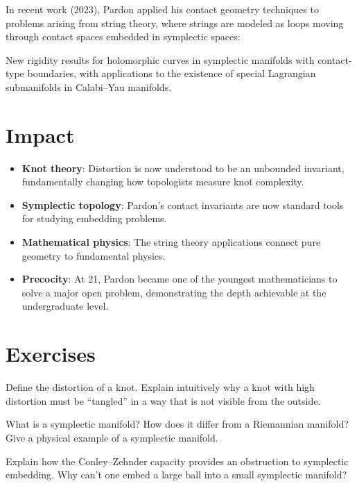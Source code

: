 In recent work (2023), Pardon applied his contact geometry techniques to problems arising from string theory, where strings are modeled as loops moving through contact spaces embedded in symplectic spaces:

\begin{theorem}
New rigidity results for holomorphic curves in symplectic manifolds with contact-type boundaries, with applications to the existence of special Lagrangian submanifolds in Calabi--Yau manifolds.
\end{theorem}

\section{Impact}
\begin{itemize}
\item \textbf{Knot theory}: Distortion is now understood to be an unbounded invariant, fundamentally changing how topologists measure knot complexity.
\item \textbf{Symplectic topology}: Pardon's contact invariants are now standard tools for studying embedding problems.
\item \textbf{Mathematical physics}: The string theory applications connect pure geometry to fundamental physics.
\item \textbf{Precocity}: At 21, Pardon became one of the youngest mathematicians to solve a major open problem, demonstrating the depth achievable at the undergraduate level.
\end{itemize}

\section{Exercises}

\begin{exercise}[Basic]
Define the distortion of a knot. Explain intuitively why a knot with high distortion must be ``tangled'' in a way that is not visible from the outside.
\end{exercise}

\begin{exercise}[Intermediate]
What is a symplectic manifold? How does it differ from a Riemannian manifold? Give a physical example of a symplectic manifold.
\end{exercise}

\begin{exercise}[Challenge]
Explain how the Conley--Zehnder capacity provides an obstruction to symplectic embedding. Why can't one embed a large ball into a small symplectic manifold?
\end{exercise}

